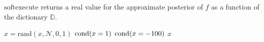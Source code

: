 $\textrm{softexecute}$ returns a real value for the approximate posterior of $f$ as a function of the dictionary $\mathbb{D}$.




\begin{exprogram}[tb]
\caption{}
\label{prog:ex2}
\begin{algorithmic}
\STATE $x = \textrm{rand}(x, \mathcal{N}, 0, 1)$
\STATE $\operatorname{cond}(x = 1)$
\ELSE
\STATE $\operatorname{cond}(x = -100)$
\ENDIF
{} $x$
\end{algorithmic}
\end{exprogram}



